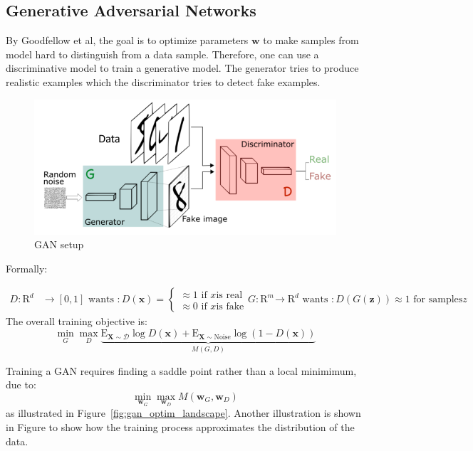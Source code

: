\documentclass[a4paper,10pt,twoside]{article}
\begin{document}
\subsection{Generative Adversarial Networks}

By Goodfellow et al, the goal is to optimize parameters $\mathbf{w}$ to make samples from model hard to distinguish from a data sample. Therefore, one can use a discriminative model to train a generative model. The generator tries to produce realistic examples which the discriminator tries to detect fake examples.

\begin{figure}
  \centering
  \includegraphics[width=.5\textwidth]{figures/GAN_scheme.png}
  \caption{GAN setup}
  \label{fig:gan_setup}
\end{figure}

Formally:

\begin{align*}
  D:\mathrm{R}^d&\rightarrow [0,1]\text{ wants }: D(\mathbf{x}) =
  \begin{cases}
    \approx 1\text{ if }x\text{is real}\\
    \approx 0\text{ if }x\text{is fake}
  \end{cases}
  G:\mathrm{R}^m&\rightarrow \mathrm{R}^d\text{ wants }: D(G(\mathbf{z})) \approx 1\text{ for samples} z
\end{align*}
The overall training objective is:
\begin{equation*}
  \min_G\max_D\underbrace{\mathrm{E}_{\mathbf{X}\sim\mathcal{D}}\log D(\mathbf{x}) +\mathrm{E}_{\mathbf{X}\sim\text{Noise}}\log (1- D(\mathbf{x}))}_{M(G,D)}
\end{equation*}

Training a GAN requires finding a saddle point rather than a local minimimum, due to:
\begin{equation*}
  \min_{\mathbf{w}_G}\max_{\mathbf{w}_D}M(\mathbf{w}_G,\mathbf{w}_D)
\end{equation*}
as illustrated in Figure~\ref{fig:gan_optim_landscape}. Another illustration is shown in Figure to show how the training process approximates the distribution of the data.
\end{document}
